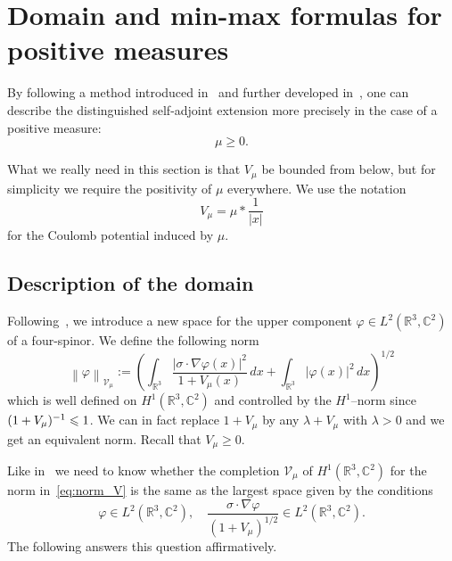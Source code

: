 \documentclass[10pt]{amsart}
\theoremstyle{definition}
\newcommand{\R}{\mathbb{R}}
\newcommand{\C}{\mathbb{C}}
\newcommand{\cV}{\mathcal{V}}
\newcommand\1{{\ensuremath {\mathds 1} }}
\renewcommand\phi{\varphi}
\newcommand{\norm}[1]{ \left\| #1 \right\|}
\renewcommand{\geq}{\geqslant}
\renewcommand{\leq}{\leqslant}
\begin{document}
\section{Domain and min-max formulas for positive measures}\label{sec:min-max}



By following a method introduced in~\cite{EstLos-07,EstLos-08} and further developed in~\cite{EstLewSer-19,SchSolTok-20}, one can describe the distinguished self-adjoint extension more precisely in the case of a positive measure:
\[
\mu\geq0.
\]

What we really need in this section is that $V_\mu$ be bounded from below, but for simplicity we require the positivity of $\mu$ everywhere. We use the notation
\[
\boxed{V_\mu=\mu\ast\frac1{|x|}}
\]
for the Coulomb potential induced by $\mu$.

\subsection{Description of the domain}
Following~\cite{EstLewSer-19}, we introduce a new space for the upper component $\phi\in L^2(\R^3,\C^2)$ of a four-spinor. We define the following norm
\begin{equation}\label{eq:norm_V}
\norm{\phi}_{\cV_\mu}:= \left(\int_{\R^3}\frac{\left|\sigma\cdot \nabla\phi(x)\right|^2}{1+V_\mu(x)}\,dx+\int_{\R^3}\left|\phi(x)\right|^2\,dx\right)^{1/2}
\end{equation}
which is well defined on $H^1(\R^3,\C^2)$ and controlled by the $H^1$--norm since $(1+V_\mu)^{-1}\linebreak\leq1$. We can in fact replace $1+V_\mu$ by any $\lambda+V_\mu$ with $\lambda>0$ and we get an equivalent norm. Recall that $V_\mu\geq0$.

Like in~\cite{EstLewSer-19} we need to know whether the completion $\cV_\mu$ of $H^1(\R^3,\C^2)$ for the norm in~\eqref{eq:norm_V} is the same as the largest space given by the conditions
\[
\phi\in L^2\left(\R^3,\C^2\right),\quad \frac{\sigma\cdot \nabla\phi}{\left(1+V_\mu\right)^{1/2}}\in L^2\left(\R^3,\C^2\right).
\]
The following answers this question affirmatively.
\end{document}
